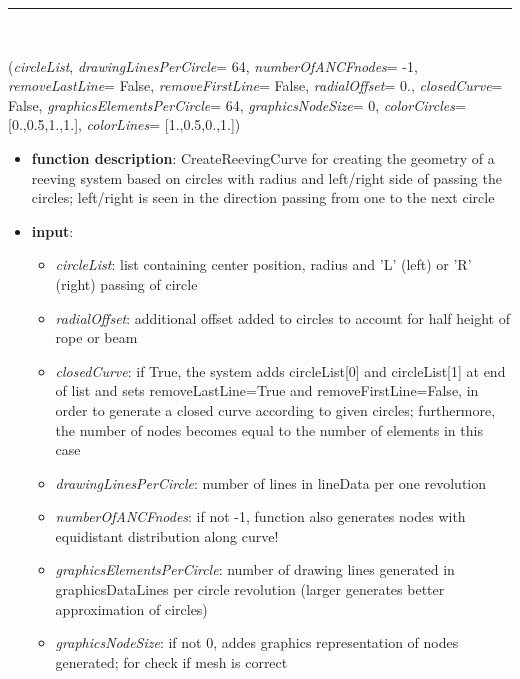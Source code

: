 \begin{itemize}[leftmargin=1.4cm]
\begin{itemize}[leftmargin=1.4cm]
\begin{itemize}[leftmargin=1.4cm]
\begin{itemize}[leftmargin=0.5cm]
\begin{itemize}[leftmargin=1.4cm]
%
\noindent\rule{8cm}{0.75pt}\vspace{1pt} \\ 
\begin{flushleft}
\label{sec:beams:CreateReevingCurve}
({\it circleList}, {\it drawingLinesPerCircle}= 64, {\it numberOfANCFnodes}= -1, {\it removeLastLine}= False, {\it removeFirstLine}= False, {\it radialOffset}= 0., {\it closedCurve}= False, {\it graphicsElementsPerCircle}= 64, {\it graphicsNodeSize}= 0, {\it colorCircles}= [0.,0.5,1.,1.], {\it colorLines}= [1.,0.5,0.,1.])
\end{flushleft}
\setlength{\itemindent}{0.7cm}
\begin{itemize}[leftmargin=0.7cm]
\item[--]
{\bf function description}: CreateReevingCurve for creating the geometry of a reeving system based on circles with radius and left/right side of passing the circles; left/right is seen in the direction passing from one to the next circle
\item[--]
{\bf input}: \vspace{-6pt}
\begin{itemize}[leftmargin=1.2cm]
\setlength{\itemindent}{-0.7cm}
\item[]{\it circleList}: list containing center position, radius and 'L' (left) or 'R' (right) passing of circle
\item[]{\it radialOffset}: additional offset added to circles to account for half height of rope or beam
\item[]{\it closedCurve}: if True, the system adds circleList[0] and  circleList[1] at end of list and sets removeLastLine=True and removeFirstLine=False, in order to generate a closed curve according to given circles; furthermore, the number of nodes becomes equal to the number of elements in this case
\item[]{\it drawingLinesPerCircle}: number of lines in lineData per one revolution
\item[]{\it numberOfANCFnodes}: if not -1, function also generates nodes with equidistant distribution along curve!
\item[]{\it graphicsElementsPerCircle}: number of drawing lines generated in graphicsDataLines per circle revolution (larger generates better approximation of circles)
\item[]{\it graphicsNodeSize}: if not 0, addes graphics representation of nodes generated; for check if mesh is correct

\end{itemize}
\end{itemize}
\end{itemize}
\end{itemize}
\end{itemize}
\end{itemize}
\end{itemize}
